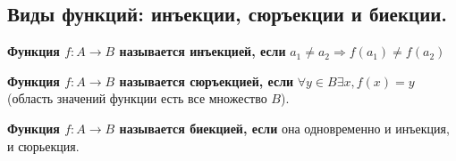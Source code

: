\subsection{Виды функций: инъекции, сюръекции и биекции.}

 \textbf{Функция $f: A \rightarrow B$ называется инъекцией, если} $a_1 \neq a_2 \Rightarrow f(a_1) \neq f(a_2)$

   \textbf{Функция $f: A \rightarrow B$ называется сюръекцией, если} $\forall y \in B \exists x, f(x) = y$ (область значений функции есть все множество $B$).

   \textbf{Функция $f: A \rightarrow B$ называется биекцией, если} она одновременно и инъекция, и сюрьекция.
